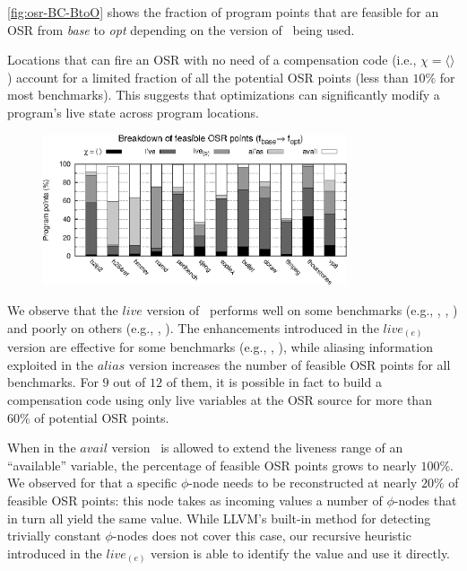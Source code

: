 \myfigure\ref{fig:osr-BC-BtoO} shows the fraction of program points that are feasible for an OSR from {\em base} to {\em opt} depending on the version of \reconstruct\ being used.

Locations that can fire an OSR with no need of a compensation code (i.e., $\chi=\langle\rangle$) account for a limited fraction of all the potential OSR points (less than $10\%$ for most benchmarks). This suggests that optimizations can significantly modify a program's live state across program locations.

\begin{figure}[!t]
\begin{center}
\includegraphics[width=0.8\textwidth]{figures/osr-BC-BtoO/osr-BC-BtoO.eps}
\caption{\protect}
\end{center}
\end{figure}

We observe that the $live$ version of \reconstruct\ performs well on some benchmarks (e.g., , , ) and poorly on others (e.g., , ). The enhancements introduced in the $live_{(e)}$ version are effective for some benchmarks (e.g., , ), while aliasing information exploited in the $alias$ version increases the number of feasible OSR points for all benchmarks. For $9$ out of $12$ of them, it is possible in fact to build a compensation code using only live variables at the OSR source for more than $60\%$ of potential OSR points.

When in the $avail$ version \reconstruct\ is allowed to extend the liveness range of an ``available'' variable, the percentage of feasible OSR points grows to nearly $100\%$. We observed for  that a specific $\phi$-node needs to be reconstructed at nearly $20\%$ of feasible OSR points: this node takes as incoming values a number of $\phi$-nodes that in turn all yield the same value. While LLVM's built-in method for detecting trivially constant $\phi$-nodes does not cover this case, our recursive heuristic introduced in the $live_{(e)}$ version is able to identify the value and use it directly.

